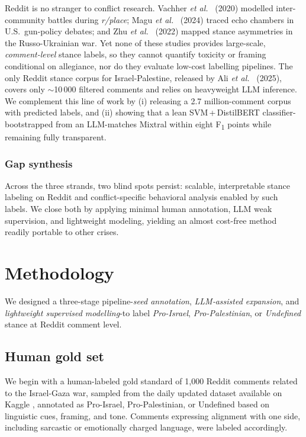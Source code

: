\documentclass[letterpaper]{article} %
\begin{document}
Reddit is no stranger to conflict research.  
Vachher \textit{et al.}~\cite{vachher2020understanding} (2020) modelled inter-community battles during \textit{r/place};  
Magu \textit{et al.}~\cite{magu2024understanding} (2024) traced echo chambers in U.S.\ gun-policy debates;  
and Zhu \textit{et al.}~\cite{zhu2022reddit} (2022) mapped stance asymmetries in the Russo-Ukrainian war.  
Yet none of these studies provides large-scale, \emph{comment-level} stance labels, so they cannot quantify toxicity or framing conditional on allegiance, nor do they evaluate low-cost labelling pipelines.  
The only Reddit stance corpus for Israel-Palestine, released by Ali \textit{et al.}~\cite{ali2025social} (2025), covers only $\sim$10\,000 filtered comments and relies on heavyweight LLM inference.  
We complement this line of work by (i) releasing a 2.7 million-comment corpus with predicted labels, and (ii) showing that a lean SVM\,+\,DistilBERT classifier-bootstrapped from an LLM-matches Mixtral within eight F\textsubscript{1} points while remaining fully transparent.

\subsubsection{Gap synthesis}

Across the three strands, two blind spots persist: scalable, interpretable stance labeling on Reddit and conflict-specific behavioral analysis enabled by such labels. We close both by applying minimal human annotation, LLM weak supervision, and lightweight modeling, yielding an almost cost-free method readily portable to other crises.


\section{Methodology}\label{sec:methodology}

We designed a three-stage pipeline-\emph{seed annotation}, \emph{LLM‐assisted expansion}, and \emph{lightweight supervised modelling}-to label \textit{Pro-Israel}, \textit{Pro-Palestinian}, or \textit{Undefined} stance at Reddit comment level.

\subsection{Human gold set}
We begin with a human-labeled gold standard of 1,000 Reddit comments related to the Israel-Gaza war, sampled from the daily updated dataset available on Kaggle \cite{asaniczka_2024}, annotated as Pro-Israel, Pro-Palestinian, or Undefined based on linguistic cues, framing, and tone. Comments expressing alignment with one side, including sarcastic or emotionally charged language, were labeled accordingly.
\end{document}
